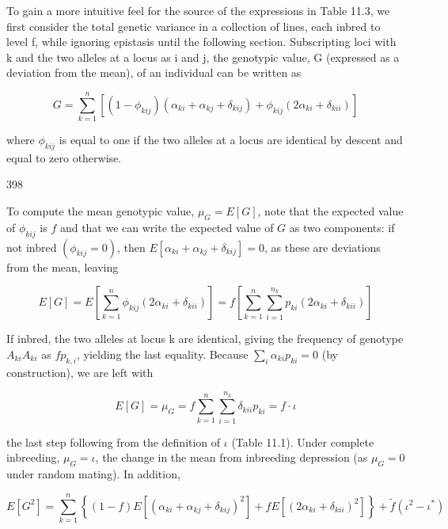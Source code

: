 \documentclass{article}
\begin{document}
To gain a more intuitive feel for the source of the expressions in Table 11.3, we first consider the total genetic variance in a collection of lines, each inbred to level f, while ignoring epistasis until the following section. Subscripting loci with k and the two alleles at a locus as i and j, the genotypic value, G (expressed as a deviation from the mean), of an individual can be written as

\begin{equation}
G=\sum_{k=1}^{n}\left[(1-\phi_{kij})(\alpha_{ki}+\alpha_{kj}+\delta_{kij})+\phi_{kij}(2\alpha_{ki}+\delta_{kii})\right]
\tag{11.5}
\label{eq:11_5}
\end{equation}

where  $ \phi_{kij} $ is equal to one if the two alleles at a locus are identical by descent and equal to zero otherwise.

398

To compute the mean genotypic value,  $ \mu_G = E[G] $, note that the expected value of  $ \phi_{kij} $ is  $ f $ and that we can write the expected value of  $ G $ as two components: if not inbred  $ (\phi_{kij} = 0) $, then  $ E[\alpha_{ki} + \alpha_{kj} + \delta_{kij}] = 0 $, as these are deviations from the mean, leaving

\begin{equation}
E[G]=E\left[\sum_{k=1}^{n}\phi_{k i j}(2\alpha_{k i}+\delta_{k i i})\right]=f\left[\sum_{k=1}^{n}\sum_{i=1}^{n_{k}}p_{k i}(2\alpha_{k i}+\delta_{k i i})\right]
\end{equation}

If inbred, the two alleles at locus k are identical, giving the frequency of genotype  $ A_{ki}A_{ki} $ as  $ fp_{k,i} $, yielding the last equality. Because  $ \sum_{i}\alpha_{ki}p_{ki}=0 $ (by construction), we are left with

\begin{equation}
E[G]=\mu_{G}=f\sum_{k=1}^{n}\sum_{i=1}^{n_{k}}\delta_{kii}p_{ki}=f\cdot\iota
\end{equation}

the last step following from the definition of  $ \iota $ (Table 11.1). Under complete inbreeding,  $ \mu_G = \iota $, the change in the mean from inbreeding depression (as  $ \mu_G = 0 $ under random mating). In addition,

\begin{equation}
E[G^{2}]=\sum_{k=1}^{n}\left\{(1-f)E[(\alpha_{ki}+\alpha_{kj}+\delta_{kij})^{2}]+fE[(2\alpha_{ki}+\delta_{kii})^{2}]\right\}+\widetilde{f}(\iota^{2}-\iota^{*})
\tag{11.6a}
\label{eq:11_6a}
\end{equation}
\end{document}
